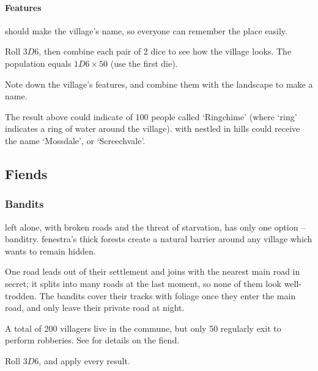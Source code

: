 \begin{multicols}{2}
\paragraph{ Features}
\label{villageFeatures}
should make the \gls{village}'s name, so everyone can remember the place easily.

Roll $3D6$, then combine each pair of 2 dice to see how the \gls{village} looks.
The population equals $1D6 \times 50$ (use the first die).

\encVillageFeatures

Note down the \gls{village}'s features, and combine them with the landscape to make a name.


The result above could indicate  of 100 people called `Ringchime' (where `ring' indicates a ring of water around the \gls{village}).
 with  nestled in hills could receive the name `Mossdale', or `Screechvale'.

\subsection{Fiends}
\label{mapFiends}

\subsubsection{Bandits}
\label{banditsPoint}

 left alone, with broken roads and the threat of starvation, has only one option -- banditry.
\Gls{fenestra}'s thick forests create a natural barrier around any \gls{village} which wants to remain hidden.

One road leads out of their settlement and joins with the nearest main road in secret; it splits into many roads at the last moment, so none of them look well-trodden.
The bandits cover their tracks with foliage once they enter the main road, and only leave their private road at night.

A total of 200 villagers live in the commune, but only 50 regularly exit to perform robberies.
See  for details on the \gls{fiend}.

Roll $3D6$, and apply every result.


\end{multicols}
